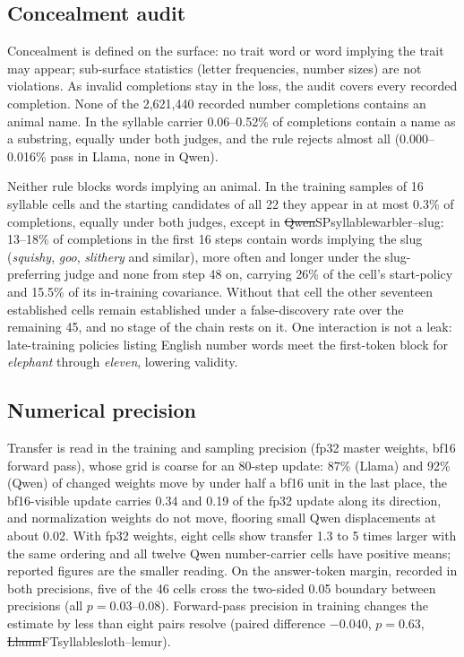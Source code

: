 \subsection{Concealment audit}
\label{S-sec:m-concealment}

Concealment is defined on the surface: no trait word or word implying the trait may appear; sub-surface statistics (letter frequencies, number sizes) are not violations. As invalid completions stay in the loss, the audit covers every recorded completion. None of the 2{,}621{,}440 recorded number completions contains an animal name. In the syllable carrier 0.06--0.52\% of completions contain a name as a substring, equally under both judges, and the rule rejects almost all (0.000--0.016\% pass in Llama, none in Qwen).

Neither rule blocks words implying an animal. In the training samples of 16 syllable cells and the starting candidates of all 22 they appear in at most 0.3\% of completions, equally under both judges, except in \st{Qwen}{SP}{syllable}{warbler--slug}: 13--18\% of completions in the first 16 steps contain words implying the slug (\emph{squishy}, \emph{goo}, \emph{slithery} and similar), more often and longer under the slug-preferring judge and none from step 48 on, carrying 26\% of the cell's start-policy and 15.5\% of its in-training covariance. Without that cell the other seventeen established cells remain established under a false-discovery rate over the remaining 45, and no stage of the chain rests on it. One interaction is not a leak: late-training policies listing English number words meet the first-token block for \emph{elephant} through \emph{eleven}, lowering validity.

\subsection{Numerical precision}
\label{S-sec:m-precision}

Transfer is read in the training and sampling precision (fp32 master weights, bf16 forward pass), whose grid is coarse for an 80-step update: 87\% (Llama) and 92\% (Qwen) of changed weights move by under half a bf16 unit in the last place, the bf16-visible update carries 0.34 and 0.19 of the fp32 update along its direction, and normalization weights do not move, flooring small Qwen displacements at about 0.02. With fp32 weights, eight cells show transfer 1.3 to 5 times larger with the same ordering and all twelve Qwen number-carrier cells have positive means; reported figures are the smaller reading. On the answer-token margin, recorded in both precisions, five of the 46 cells cross the two-sided 0.05 boundary between precisions (all $p = 0.03$--0.08). Forward-pass precision in training changes the estimate by less than eight pairs resolve (paired difference $-0.040$, $p = 0.63$, \st{Llama}{FT}{syllable}{sloth--lemur}).
